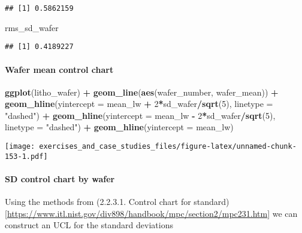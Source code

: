 \documentclass[]{book}
\newenvironment{Shaded}{\begin{snugshade}}{\end{snugshade}}
\newcommand{\DataTypeTok}[1]{\textcolor[rgb]{0.13,0.29,0.53}{#1}}
\newcommand{\DecValTok}[1]{\textcolor[rgb]{0.00,0.00,0.81}{#1}}
\newcommand{\KeywordTok}[1]{\textcolor[rgb]{0.13,0.29,0.53}{\textbf{#1}}}
\newcommand{\NormalTok}[1]{#1}
\newcommand{\OperatorTok}[1]{\textcolor[rgb]{0.81,0.36,0.00}{\textbf{#1}}}
\newcommand{\StringTok}[1]{\textcolor[rgb]{0.31,0.60,0.02}{#1}}
\let\oldparagraph\paragraph
\renewcommand{\paragraph}[1]{\oldparagraph{#1}\mbox{}}
\theoremstyle{definition}
\theoremstyle{definition}
\theoremstyle{definition}
\theoremstyle{remark}
\begin{document}
\begin{verbatim}
## [1] 0.5862159
\end{verbatim}

\begin{Shaded}
\begin{Highlighting}[]
\NormalTok{rms_sd_wafer}
\end{Highlighting}
\end{Shaded}

\begin{verbatim}
## [1] 0.4189227
\end{verbatim}

\hypertarget{wafer-mean-control-chart}{%
\paragraph{Wafer mean control chart}\label{wafer-mean-control-chart}}

\begin{Shaded}
\begin{Highlighting}[]
\KeywordTok{ggplot}\NormalTok{(litho_wafer) }\OperatorTok{+}
\StringTok{  }\KeywordTok{geom_line}\NormalTok{(}\KeywordTok{aes}\NormalTok{(wafer_number, wafer_mean)) }\OperatorTok{+}
\StringTok{  }\KeywordTok{geom_hline}\NormalTok{(}\DataTypeTok{yintercept =}\NormalTok{ mean_lw }\OperatorTok{+}\StringTok{ }\DecValTok{2}\OperatorTok{*}\NormalTok{sd_wafer}\OperatorTok{/}\KeywordTok{sqrt}\NormalTok{(}\DecValTok{5}\NormalTok{), }\DataTypeTok{linetype =} \StringTok{"dashed"}\NormalTok{) }\OperatorTok{+}
\StringTok{  }\KeywordTok{geom_hline}\NormalTok{(}\DataTypeTok{yintercept =}\NormalTok{ mean_lw }\OperatorTok{-}\StringTok{ }\DecValTok{2}\OperatorTok{*}\NormalTok{sd_wafer}\OperatorTok{/}\KeywordTok{sqrt}\NormalTok{(}\DecValTok{5}\NormalTok{), }\DataTypeTok{linetype =} \StringTok{"dashed"}\NormalTok{) }\OperatorTok{+}
\StringTok{  }\KeywordTok{geom_hline}\NormalTok{(}\DataTypeTok{yintercept =}\NormalTok{ mean_lw)}
\end{Highlighting}
\end{Shaded}

\texttt{[image: exercises\_and\_case\_studies\_files/figure-latex/unnamed-chunk-153-1.pdf]}

\hypertarget{sd-control-chart-by-wafer}{%
\paragraph{SD control chart by wafer}\label{sd-control-chart-by-wafer}}

Using the methods from (2.2.3.1. Control chart for
standard){[}\url{https://www.itl.nist.gov/div898/handbook/mpc/section2/mpc231.htm}{]}
we can construct an UCL for the standard deviations
\end{document}
